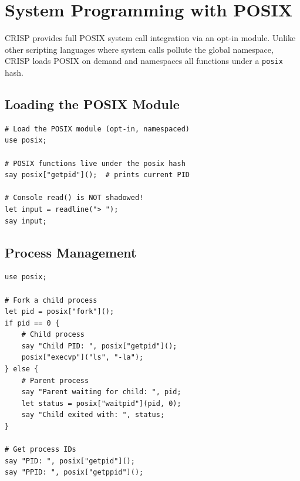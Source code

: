 \section{System Programming with POSIX}

CRISP provides full POSIX system call integration via an opt-in module. Unlike other scripting languages where system calls pollute the global namespace, CRISP loads POSIX on demand and namespaces all functions under a \texttt{posix} hash.

\subsection{Loading the POSIX Module}

\begin{tcolorbox}[colback=codebg, colframe=darkpurple, colbacktitle=darkpurple, title=\textbf{\textcolor{codegold}{Loading POSIX}}, fonttitle=\bfseries, sharp corners]
\begin{lstlisting}
# Load the POSIX module (opt-in, namespaced)
use posix;

# POSIX functions live under the posix hash
say posix["getpid"]();  # prints current PID

# Console read() is NOT shadowed!
let input = readline("> ");
say input;
\end{lstlisting}
\end{tcolorbox}

\subsection{Process Management}

\begin{tcolorbox}[colback=codebg, colframe=darkpurple, colbacktitle=darkpurple, title=\textbf{\textcolor{codegold}{Process Management}}, fonttitle=\bfseries, sharp corners]
\begin{lstlisting}
use posix;

# Fork a child process
let pid = posix["fork"]();
if pid == 0 {
    # Child process
    say "Child PID: ", posix["getpid"]();
    posix["execvp"]("ls", "-la");
} else {
    # Parent process
    say "Parent waiting for child: ", pid;
    let status = posix["waitpid"](pid, 0);
    say "Child exited with: ", status;
}

# Get process IDs
say "PID: ", posix["getpid"]();
say "PPID: ", posix["getppid"]();
\end{lstlisting}
\end{tcolorbox}

